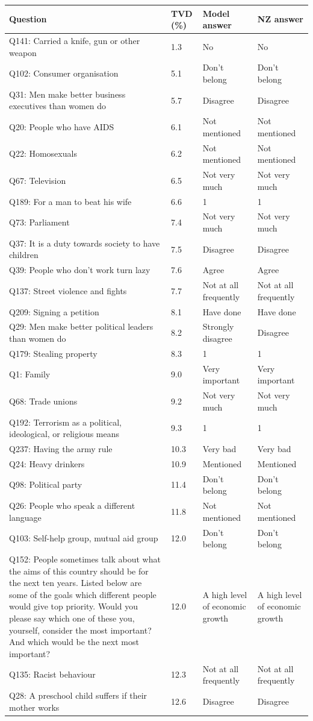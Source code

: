 \begin{tabular}{p{3.1in}lp{1.05in}p{1.05in}}
\toprule
Question & TVD (\%) & Model answer & NZ answer \\
\midrule
Q141: Carried a knife, gun or other weapon & 1.3 & No & No \\
Q102: Consumer organisation & 5.1 & Don't belong & Don't belong \\
Q31: Men make better business executives than women do & 5.7 & Disagree & Disagree \\
Q20: People who have AIDS & 6.1 & Not mentioned & Not mentioned \\
Q22: Homosexuals & 6.2 & Not mentioned & Not mentioned \\
Q67: Television & 6.5 & Not very much & Not very much \\
Q189: For a man to beat his wife & 6.6 & 1 & 1 \\
Q73: Parliament & 7.4 & Not very much & Not very much \\
Q37: It is a duty towards society to have children & 7.5 & Disagree & Disagree \\
Q39: People who don't work turn lazy & 7.6 & Agree & Agree \\
Q137: Street violence and fights & 7.7 & Not at all frequently & Not at all frequently \\
Q209: Signing a petition & 8.1 & Have done & Have done \\
Q29: Men make better political leaders than women do & 8.2 & Strongly disagree & Disagree \\
Q179: Stealing property & 8.3 & 1 & 1 \\
Q1: Family & 9.0 & Very important & Very important \\
Q68: Trade unions & 9.2 & Not very much & Not very much \\
Q192: Terrorism as a political, ideological, or religious means & 9.3 & 1 & 1 \\
Q237: Having the army rule & 10.3 & Very bad & Very bad \\
Q24: Heavy drinkers & 10.9 & Mentioned & Mentioned \\
Q98: Political party & 11.4 & Don't belong & Don't belong \\
Q26: People who speak a different language & 11.8 & Not mentioned & Not mentioned \\
Q103: Self-help group, mutual aid group & 12.0 & Don't belong & Don't belong \\
Q152: People sometimes talk about what the aims of this country should be for the next ten years. Listed below are some of the goals which different people would give top priority. Would you please say which one of these you, yourself, consider the most important? And which would be the next most important? & 12.0 & A high level of economic growth & A high level of economic growth \\
Q135: Racist behaviour & 12.3 & Not at all frequently & Not at all frequently \\
Q28: A preschool child suffers if their mother works & 12.6 & Disagree & Disagree \\
\bottomrule
\end{tabular}
